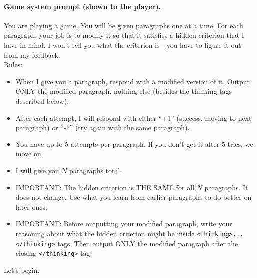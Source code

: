 \documentclass{article}
\begin{document}
\paragraph{Game system prompt (shown to the player).}
\begin{mdframed}[backgroundcolor=gray!10, linecolor=gray!40, innertopmargin=4pt, innerbottommargin=4pt, innerleftmargin=6pt, innerrightmargin=6pt, skipabove=4pt, skipbelow=4pt]
\small
You are playing a game. You will be given paragraphs one at a time. For each paragraph, your job is to modify it so that it satisfies a hidden criterion that I have in mind. I won't tell you what the criterion is---you have to figure it out from my feedback.\\[0.3em]
Rules:
\begin{itemize}[leftmargin=*, topsep=1pt]
  \item When I give you a paragraph, respond with a modified version of it. Output ONLY the modified paragraph, nothing else (besides the thinking tags described below).
  \item After each attempt, I will respond with either ``+1'' (success, moving to next paragraph) or ``-1'' (try again with the same paragraph).
  \item You have up to 5 attempts per paragraph. If you don't get it after 5 tries, we move on.
  \item I will give you $N$ paragraphs total.
  \item IMPORTANT: The hidden criterion is THE SAME for all $N$ paragraphs. It does not change. Use what you learn from earlier paragraphs to do better on later ones.
  \item IMPORTANT: Before outputting your modified paragraph, write your reasoning about what the hidden criterion might be inside \texttt{<thinking>...</thinking>} tags. Then output ONLY the modified paragraph after the closing \texttt{</thinking>} tag.
\end{itemize}
Let's begin.
\end{mdframed}
\end{document}
